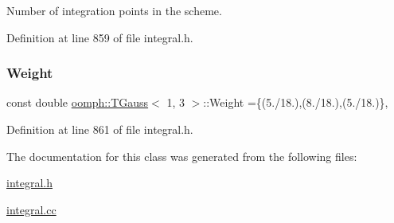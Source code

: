 Number of integration points in the scheme. 



Definition at line 859 of file integral.\+h.

\mbox{\label{classoomph_1_1TGauss_3_011_00_013_01_4_aa2fb3bfed7d3c785b33ca5f55eae9ff0}} 
\subsubsection{\texorpdfstring{Weight}{Weight}}
{\footnotesize\ttfamily const double \hyperlink{classoomph_1_1TGauss}{oomph\+::\+T\+Gauss}$<$ 1, 3 $>$\+::Weight =\{(5./18.),(8./18.),(5./18.)\}\hspace{0.3cm}{\ttfamily [static]}, {\ttfamily [private]}}



Definition at line 861 of file integral.\+h.



The documentation for this class was generated from the following files\+:\begin{DoxyCompactItemize}
\item 
\hyperlink{integral_8h}{integral.\+h}\item 
\hyperlink{integral_8cc}{integral.\+cc}\end{DoxyCompactItemize}
